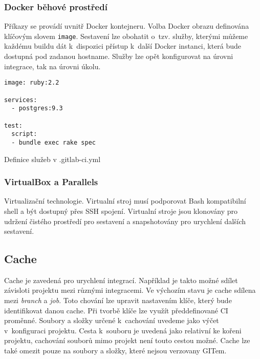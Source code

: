 \subsubsection{Docker běhové prostředí}

Příkazy se provádí uvnitř Docker kontejneru.
Volba Docker obrazu definována klíčovým slovem \verb|image|.
Sestavení lze obohatit o~tzv. služby, kterými můžeme každému buildu dát k~dispozici přístup k~další Docker instanci, která bude dostupná pod zadanou hostname.
Služby lze opět konfigurovat na úrovni integrace, tak na úrovni úkolu.

\begin{listing}[ht]
\begin{verbatim}
image: ruby:2.2

services:
  - postgres:9.3

test:
  script:
  - bundle exec rake spec
\end{verbatim}
\caption{Definice služeb v .gitlab-ci.yml}
\end{listing}

\subsubsection{VirtualBox a Parallels}

Virtualizační technologie.
Virtualní stroj musí podporovat Bash kompatibilní shell a být dostupný přes SSH spojení.
Virtualní stroje jsou klonovány pro udržení čistého prostředí pro sestavení a snapshotovány pro urychlení dalších sestavení.


\subsection{Cache}

Cache je zavedená pro urychlení integrací.
Například je takto možné sdílet závisloti projektu mezi různými integracemi.
Ve výchozím stavu je cache sdílena mezi \textit{branch} a \textit{job}.
Toto chování lze upravit nastavením klíče, který bude identifikovat danou cache.
Při tvorbě klíče lze využít předdefinované CI proměnné. 
Soubory a složky určené k~cachování uvedeme jako výčet v~konfiguraci projektu.
Cesta k~souboru je uvedená jako relativní ke kořeni projektu, cachování souborů mimo projekt není touto cestou možné. 
Cache lze také omezit pouze na soubory a složky, které nejsou verzovany GITem.

